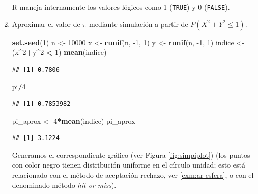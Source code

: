 \documentclass[
]{book}
\newenvironment{Shaded}{\begin{snugshade}}{\end{snugshade}}
\newcommand{\DecValTok}[1]{\textcolor[rgb]{0.00,0.00,0.81}{#1}}
\newcommand{\KeywordTok}[1]{\textcolor[rgb]{0.13,0.29,0.53}{\textbf{#1}}}
\newcommand{\NormalTok}[1]{#1}
\newcommand{\OperatorTok}[1]{\textcolor[rgb]{0.81,0.36,0.00}{\textbf{#1}}}
\newcommand{\StringTok}[1]{\textcolor[rgb]{0.31,0.60,0.02}{#1}}
\theoremstyle{break}
\theoremstyle{definition}
\theoremstyle{definition}
\theoremstyle{definition}
\theoremstyle{remark}
\begin{document}
\begin{enumerate}
  {}R maneja internamente los valores lógicos como 1 (\texttt{TRUE}) y 0 (\texttt{FALSE}).

\item
  Aproximar el valor de \(\pi\) mediante simulación a partir de
  \(P\left( X^2 +Y^2 \leq 1 \right)\).

\begin{Shaded}
\begin{Highlighting}[]
\KeywordTok{set.seed}\NormalTok{(}\DecValTok{1}\NormalTok{)}
\NormalTok{n <-}\StringTok{ }\DecValTok{10000}
\NormalTok{x <-}\StringTok{ }\KeywordTok{runif}\NormalTok{(n, }\DecValTok{-1}\NormalTok{, }\DecValTok{1}\NormalTok{)}
\NormalTok{y <-}\StringTok{ }\KeywordTok{runif}\NormalTok{(n, }\DecValTok{-1}\NormalTok{, }\DecValTok{1}\NormalTok{)}
\NormalTok{indice <-}\StringTok{ }\NormalTok{(x}\OperatorTok{^}\DecValTok{2}\OperatorTok{+}\NormalTok{y}\OperatorTok{^}\DecValTok{2} \OperatorTok{<}\StringTok{ }\DecValTok{1}\NormalTok{)}
\KeywordTok{mean}\NormalTok{(indice)}
\end{Highlighting}
\end{Shaded}

\begin{verbatim}
## [1] 0.7806
\end{verbatim}

\begin{Shaded}
\begin{Highlighting}[]
\NormalTok{pi}\OperatorTok{/}\DecValTok{4}
\end{Highlighting}
\end{Shaded}

\begin{verbatim}
## [1] 0.7853982
\end{verbatim}

\begin{Shaded}
\begin{Highlighting}[]
\NormalTok{pi_aprox <-}\StringTok{ }\DecValTok{4}\OperatorTok{*}\KeywordTok{mean}\NormalTok{(indice)}
\NormalTok{pi_aprox}
\end{Highlighting}
\end{Shaded}

\begin{verbatim}
## [1] 3.1224
\end{verbatim}

  Generamos el correspondiente gráfico (ver Figura \ref{fig:simpiplot}) (los puntos con color negro tienen distribución uniforme en el círculo unidad; esto está relacionado con el método de aceptación-rechazo, ver \ref{exm:ar-esfera}, o con el denominado método \emph{hit-or-miss}).


\end{enumerate}
\end{document}
